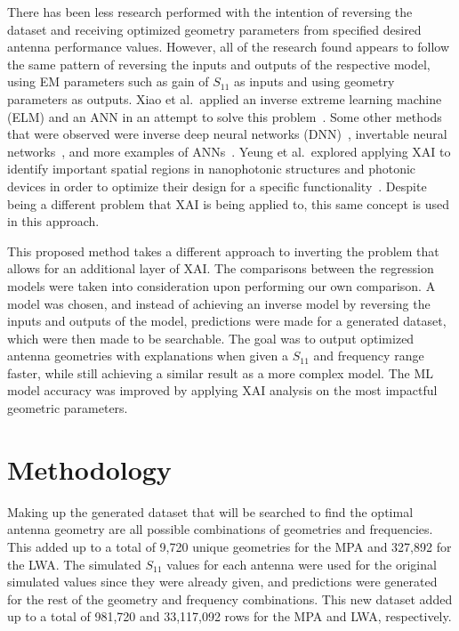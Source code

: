 \documentclass[conference]{IEEEtran}
\begin{document}
There has been less research performed with the intention of reversing the dataset and receiving optimized geometry parameters from specified desired antenna performance values. However, all of the research found appears to follow the same pattern of reversing the inputs and outputs of the respective model, using EM parameters such as gain of $S_{11}$ as inputs and using geometry parameters as outputs. Xiao et al.~applied an inverse extreme learning machine (ELM) and an ANN in an attempt to solve this problem~\cite{9063448,XiaoLi-Ye2021IANN}. Some other methods that were observed were inverse deep neural networks (DNN)~\cite{wu_ai_2024,zhang_inverse_2023}, invertable neural networks~\cite{yu_design_2020}, and more examples of ANNs~\cite{yuan_multibranch_2020}. Yeung et al.~explored applying XAI to identify important spatial regions in nanophotonic structures and photonic devices in order to optimize their design for a specific functionality~\cite{YeungChristopher2020EtBo,YeungChristopher2022EAOP}. Despite being a different problem that XAI is being applied to, this same concept is used in this approach. 

This proposed method takes a different approach to inverting the problem that allows for an additional layer of XAI. The comparisons between the regression models were taken into consideration upon performing our own comparison. A model was chosen, and instead of achieving an inverse model by reversing the inputs and outputs of the model, predictions were made for a generated dataset, which were then made to be searchable. The goal was to output optimized antenna geometries with explanations when given a $S_{11}$ and frequency range faster, while still achieving a similar result as a more complex model. The ML model accuracy was improved by applying XAI analysis on the most impactful geometric parameters. 


\section{Methodology}
Making up the generated dataset that will be searched to find the optimal antenna geometry are all possible combinations of geometries and frequencies. This added up to a total of 9,720 unique geometries for the MPA and 327,892 for the LWA. The simulated $S_{11}$ values for each antenna were used for the original simulated values since they were already given, and predictions were generated for the rest of the geometry and frequency combinations. This new dataset added up to a total of 981,720 and 33,117,092 rows for the MPA and LWA, respectively.
\end{document}
